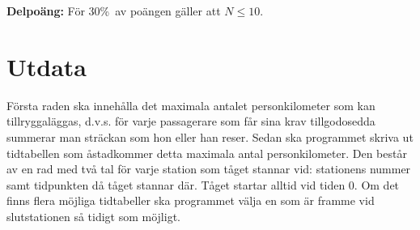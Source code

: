 {\bf Delpoäng:} För 30\%\ av poängen gäller att $N \le 10$.

\section*{Utdata}

Första raden ska innehålla det maximala antalet personkilometer som kan tillryggaläggas, d.v.s. för varje passagerare som får sina krav tillgodosedda summerar man sträckan som hon eller han reser. Sedan ska programmet skriva ut tidtabellen som åstadkommer detta maximala antal personkilometer. Den består av en rad med två tal för varje station som tåget stannar vid: stationens nummer samt tidpunkten då tåget stannar där. Tåget startar alltid vid tiden 0. Om det finns flera möjliga tidtabeller ska programmet välja en som är framme vid slutstationen så tidigt som möjligt.

